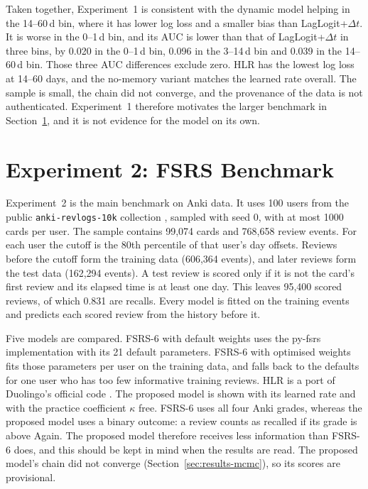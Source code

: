 Taken together, Experiment~1 is consistent with the dynamic model helping in the 14--60\,d bin, where
it has lower log loss and a smaller bias than LagLogit+$\Delta t$. It is worse in the 0--1\,d bin, and
its AUC is lower than that of LagLogit+$\Delta t$ in three bins, by 0.020 in the 0--1\,d bin, 0.096
in the 3--14\,d bin and 0.039 in the 14--60\,d bin. Those three AUC differences exclude zero. HLR has the
lowest log loss at 14--60 days, and the no-memory variant matches the learned rate overall. The sample
is small, the chain did not converge, and the provenance of the data is not authenticated. Experiment~1
therefore motivates the larger benchmark in Section~\ref{sec:results-exp2}, and it is not evidence for
the model on its own.

\section{Experiment 2: FSRS Benchmark}
\label{sec:results-exp2}

Experiment~2 is the main benchmark on Anki data. It uses 100 users from the public
\texttt{anki-revlogs-10k} collection \cite{ankirevlogs10k}, sampled with seed 0, with at most 1000
cards per user. The sample contains 99,074 cards and 768,658 review events. For each user the cutoff is
the 80th percentile of that user's day offsets. Reviews before the cutoff form the training data (606,364
events), and later reviews form the test data (162,294 events). A test review is scored only if it is not
the card's first review and its elapsed time is at least one day. This leaves 95,400 scored reviews, of
which 0.831 are recalls. Every model is fitted on the training events and predicts each scored review
from the history before it.

Five models are compared. FSRS-6 with default weights uses the py-fsrs implementation \cite{pyfsrs} with
its 21 default parameters. FSRS-6 with optimised weights fits those parameters per user on the training
data, and falls back to the defaults for one user who has too few informative training reviews. HLR is a
port of Duolingo's official code \cite{settles2016trainable}. The proposed model is shown with its learned
rate and with the practice coefficient $\kappa$ free. FSRS-6 uses all four Anki grades, whereas the
proposed model uses a binary outcome: a review counts as recalled if its grade is above Again. The
proposed model therefore receives less information than FSRS-6 does, and this should be kept in mind when
the results are read. The proposed model's chain did not converge (Section~\ref{sec:results-mcmc}), so its
scores are provisional.

